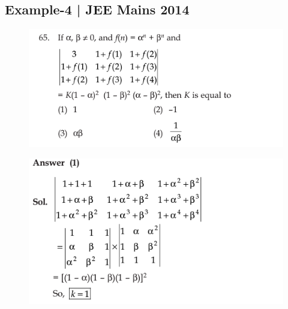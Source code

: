 \documentclass{article}
\begin{document}
\subsection*{Example-4 | JEE Mains 2014}

\begin{figure}[H]
    
    \includegraphics[scale=0.7]{determinants_lec5_exa4-que.png}
\end{figure}
\begin{figure}[H]
    \includegraphics[scale=0.7]{determinants_lec5_exa4-ans.png}
\end{figure}
\end{document}
